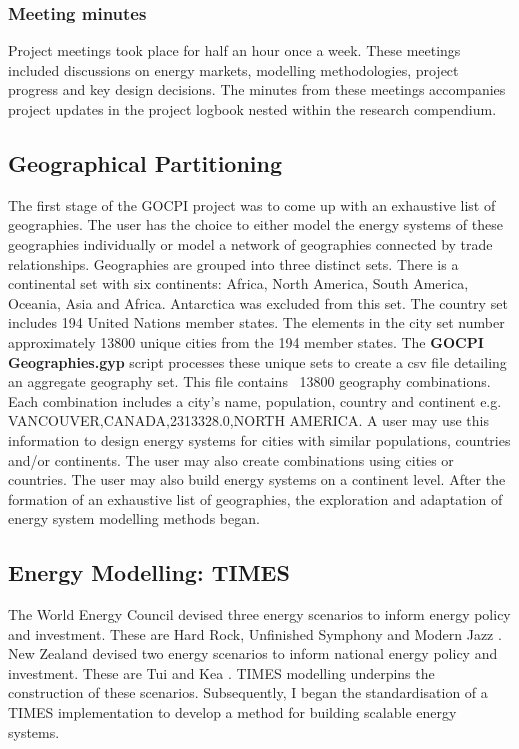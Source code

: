 \documentclass[12pt]{article}
\begin{document}
\subsubsection{Meeting minutes}
Project meetings took place for half an hour once a week. 
These meetings included discussions on energy markets, modelling methodologies, project progress and key design decisions.
The minutes from these meetings accompanies project updates in the project logbook nested within the research compendium.

\subsection{Geographical Partitioning}\label{geopar}
The first stage of the GOCPI project was to come up with an exhaustive list of geographies. 
The user has the choice to either model the energy systems of these geographies individually or model a network of geographies connected by trade relationships.
Geographies are grouped into three distinct sets. 
There is a continental set with six continents: Africa, North America, South America, Oceania, Asia and Africa.
Antarctica was excluded from this set.
The country set includes 194 United Nations member states. The elements in the city set number approximately 13800 unique cities from the 194 member states.
The \textbf{GOCPI Geographies.gyp} script processes these unique sets to create a csv file detailing an aggregate geography set.
This file contains ~13800 geography combinations. Each combination includes a city's name, population, country and continent e.g. VANCOUVER,CANADA,2313328.0,NORTH AMERICA.
A user may use this information to design energy systems for cities with similar populations, countries and/or continents. 
The user may also create combinations using cities or countries.
The user may also build energy systems on a continent level. 
After the formation of an exhaustive list of geographies, the exploration and adaptation of energy system modelling methods began.

\subsection{Energy Modelling: TIMES}
The World Energy Council devised three energy scenarios to inform energy policy and investment. These are Hard Rock, Unfinished Symphony and Modern Jazz \cite{TR:8}.
New Zealand devised two energy scenarios to inform national energy policy and investment. These are Tui and Kea \cite{TR:2}. 
TIMES modelling underpins the construction of these scenarios.
Subsequently, I began the standardisation of a TIMES implementation to develop a method for building scalable energy systems.
\end{document}
